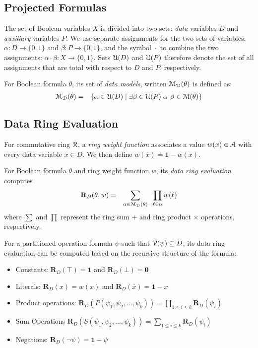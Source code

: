 \documentclass[letterpaper,USenglish,cleveref, autoref, thm-restate]{lipics-v2021}
\newcommand{\tautology}{\top}
\newcommand{\nil}{\bot}
\newcommand{\obar}[1]{\overline{#1}}
\newcommand{\lit}{\ell}
\newcommand{\dvarset}{D}
\newcommand{\varset}{X}
\newcommand{\pvarset}{P}
\newcommand{\dependencyset}{{\cal V}}
\newcommand{\ring}{{\cal R}}
\newcommand{\dset}{{\cal A}}
\newcommand{\drep}{\textbf{R}_D}
\newcommand{\radd}{+}
\newcommand{\rmul}{\times}
\newcommand{\addident}{\textbf{0}}
\newcommand{\mulident}{\textbf{1}}
\newcommand{\uassign}{{\cal U}}
\newcommand{\modelset}{{\cal M}}
\newcommand{\dassign}{\alpha}
\newcommand{\passign}{\beta}
\newcommand{\acombine}{\!\cdot\!}
\newcommand{\dmodelset}{{\cal M_{D}}}
\begin{document}
\subsection{Projected Formulas}

The set of Boolean variables $\varset$ is divided into two sets: {\em data} variables
$\dvarset$ and {\em auxiliary} variables $\pvarset$.  We use separate
assignments for the two sets of variables:
$\dassign \colon \dvarset \rightarrow \{0,1\}$
 and
 $\passign \colon \pvarset \rightarrow \{0,1\}$, and the symbol $\acombine$ to combine the two assignments:
 $\dassign\acombine\passign \colon \varset \rightarrow \{0,1\}$.
Sets $\uassign(\dvarset)$ and $\uassign(\pvarset)$ therefore denote the set of all assignments that are total with respect to $\dvarset$ and $\pvarset$, respectively.

For Boolean formula $\theta$,
its set of {\em data models}, written $\dmodelset(\theta)$ is defined as:
\begin{eqnarray}
\dmodelset(\theta) & = & \{ \dassign \in \uassign(\dvarset) \mid  \exists \passign \in \uassign(\pvarset) \; \dassign\acombine\passign \in \modelset(\theta) \} \label{eqn:dmodelset}
\end{eqnarray}

\subsection{Data Ring Evaluation}

  For commutative ring $\ring$, a {\em ring weight function} associates a value $w(x) \in \dset$ with
  every data variable $x \in \dvarset$.  We then define $w(\obar{x}) \doteq \mulident-w(x)$.

  For Boolean formula $\theta$ and ring weight function $w$, its {\em data ring evaluation} computes
  \begin{eqnarray}
    \drep(\theta, w) & = & \sum_{\alpha \in \dmodelset(\theta)} \;\; \prod_{\lit \in \alpha} w(\lit) \label{eqn:rep}
  \end{eqnarray}
where $\sum$ and $\prod$ represent the ring sum $\radd$ and ring product $\rmul$ operations, respectively.

For a partitioned-operation formula $\psi$ such that $\dependencyset(\psi) \subseteq \dvarset$, its data ring evaluation can be computed based on the recursive structure of the formula:
\begin{itemize}
\item Constants: $\drep(\tautology) = \mulident$ and $\drep(\nil) = \addident$
\item Literals: $\drep(x) = w(x)$ and $\drep(\obar{x}) = \mulident - x$
\item Product operations: 
$\drep(P(\psi_1, \psi_2, \ldots, \psi_k)) = \prod_{1 \leq i \leq k} \drep(\psi_i)$
\item Sum Operations
$\drep(S(\psi_1, \psi_2, \ldots, \psi_k)) = \sum_{1 \leq i \leq k} \drep(\psi_i)$
\item Negations: $\drep(\neg \psi) = \mulident -\psi$
\end{itemize}
\end{document}
